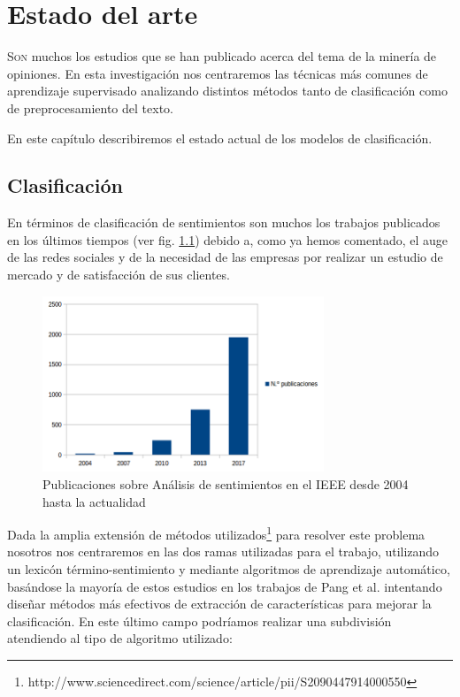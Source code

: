 

\chapter{Estado del arte}

\lettrine{S}{on} muchos los estudios que se han publicado acerca del tema de la minería de opiniones. En esta investigación nos centraremos las técnicas más comunes de aprendizaje supervisado analizando distintos métodos tanto de clasificación como de preprocesamiento del texto.

En este capítulo describiremos el estado actual de los modelos de clasificación.

\section{Clasificación}
En términos de clasificación de sentimientos son muchos los trabajos publicados en los últimos tiempos (ver fig. \ref{pubsent}) debido a, como ya hemos comentado, el auge de las redes sociales y de la necesidad de las empresas por realizar un estudio de mercado y de satisfacción de sus clientes.

\begin{figure}[!ht]
	\centering
	\includegraphics[width=0.75\textwidth]{imaxes/pubsentAnalisis.png}
	\caption{Publicaciones sobre Análisis de sentimientos en el IEEE desde 2004 hasta la actualidad}
		\label{pubsent}
\end{figure}

Dada la amplia extensión de métodos utilizados\footnote{http://www.sciencedirect.com/science/article/pii/S2090447914000550} para resolver este problema nosotros nos centraremos en las dos ramas utilizadas para el trabajo, utilizando un lexicón término-sentimiento \cite{PabloG} y mediante algoritmos de aprendizaje automático, basándose la mayoría de estos estudios en los trabajos de Pang et al. \cite{Pang} intentando diseñar métodos más efectivos de extracción de características para mejorar la clasificación. En este último campo podríamos realizar una subdivisión atendiendo al tipo de algoritmo utilizado:


